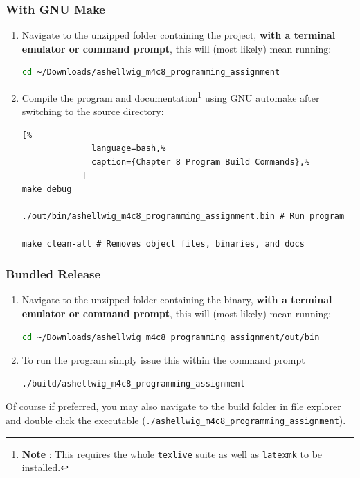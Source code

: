 \documentclass[a4paper, 11pt]{article}
\theoremstyle{definition}
\theoremstyle{plain}
\begin{document}
      \subsubsection{With GNU Make}
        \begin{enumerate}
          \item Navigate to the unzipped folder containing the project,
            \textbf{with a terminal emulator or command prompt}, this will
            (most likely) mean running:
            \begin{lstlisting}[language=bash]
cd ~/Downloads/ashellwig_m4c8_programming_assignment
            \end{lstlisting}
          \item Compile the program and documentation\footnote{\textbf{Note%
            }: This requires the whole \texttt{texlive} suite as well as
            \texttt{latexmk} to be installed.} using GNU automake after
            switching to the source directory:
            \begin{lstlisting}[%
              language=bash,%
              caption={Chapter 8 Program Build Commands},%
            ]
make debug

./out/bin/ashellwig_m4c8_programming_assignment.bin # Run program

make clean-all # Removes object files, binaries, and docs
            \end{lstlisting}
          \end{enumerate}
      \subsubsection{Bundled Release}
        \begin{enumerate}
          \item Navigate to the unzipped folder containing the binary,
            \textbf{with a terminal emulator or command prompt}, this will
            (most likely) mean running:
            \begin{lstlisting}[language=bash]
cd ~/Downloads/ashellwig_m4c8_programming_assignment/out/bin
            \end{lstlisting}
          \item To run the program simply issue this within the command
            prompt
            \begin{lstlisting}[language=bash]
./build/ashellwig_m4c8_programming_assignment
            \end{lstlisting}
        \end{enumerate}
        Of course if preferred, you may also navigate to the build folder in
          file explorer and double click the executable
          (\texttt{./ashellwig\_m4c8\_programming\_assignment}).
\end{document}
